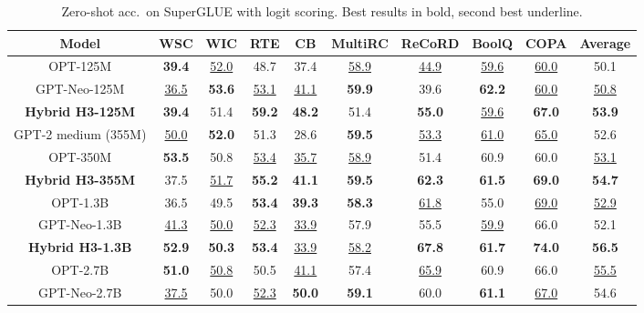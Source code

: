 \documentclass{article}
\newcommand{\hthree}{\textsc{H3}\xspace}
\begin{document}
 \begin{table}[t]
\scriptsize
    \centering
\caption{\label{table:superglue_zeroshot_logit} Zero-shot acc.\ on SuperGLUE with logit scoring. Best results in bold, second best underline. }
{
        \begin{tabular}{@{}|c|cccccccc|c|@{}}
            \hline
Model & WSC & WIC & RTE & CB & MultiRC & ReCoRD & BoolQ & COPA & Average \\ \hline
OPT-125M & \textbf{39.4} & \underline{52.0} & 48.7 & 37.4 & \underline{58.9} & \underline{44.9} & \underline{59.6} & \underline{60.0} & 50.1 \\
        GPT-Neo-125M & \underline{36.5} & \textbf{53.6} & \underline{53.1} & \underline{41.1} & \textbf{59.9} & 39.6 & \textbf{62.2} & \underline{60.0} & \underline{50.8} \\
\textbf{Hybrid \hthree-125M} & \textbf{39.4} & 51.4 & \textbf{59.2} & \textbf{48.2} & 51.4 & \textbf{55.0} & \underline{59.6} & \textbf{67.0} & \textbf{53.9} \\ \hline GPT-2 medium (355M) & \underline{50.0} & \textbf{52.0} & 51.3 & 28.6 & \textbf{59.5} & \underline{53.3} & \underline{61.0} & \underline{65.0} & 52.6 \\
OPT-350M & \textbf{53.5} & 50.8 & \underline{53.4} & \underline{35.7} & \underline{58.9} & 51.4 & 60.9 & 60.0 & \underline{53.1} \\
        \textbf{Hybrid \hthree-355M} & 37.5 & \underline{51.7} & \textbf{55.2} & \textbf{41.1} & \textbf{59.5} & \textbf{62.3} & \textbf{61.5} & \textbf{69.0} & \textbf{54.7} \\ \hline
OPT-1.3B & 36.5 & 49.5 & \textbf{53.4} & \textbf{39.3} & \textbf{58.3} & \underline{61.8} & 55.0 & \underline{69.0} & \underline{52.9} \\
        GPT-Neo-1.3B & \underline{41.3} & \underline{50.0} & \underline{52.3} & \underline{33.9} & 57.9 & 55.5 & \underline{59.9} & 66.0 & 52.1 \\
        \textbf{Hybrid \hthree-1.3B} & \textbf{52.9} & \textbf{50.3} & \textbf{53.4} & \underline{33.9} & \underline{58.2} & \textbf{67.8} & \textbf{61.7} & \textbf{74.0} & \textbf{56.5} \\ \hline
        OPT-2.7B & \textbf{51.0} & \underline{50.8} & 50.5 & \underline{41.1} & 57.4 & \underline{65.9} & 60.9 & 66.0 & \underline{55.5} \\
        GPT-Neo-2.7B & \underline{37.5} & 50.0 & \underline{52.3} & \textbf{50.0} & \textbf{59.1} & 60.0 & \textbf{61.1} & \underline{67.0} & 54.6 \\

\end{tabular}}
\end{table}
\end{document}
